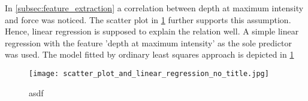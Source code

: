 

In \cref{subsec:feature_extraction} a correlation between depth at maximum intensity and force was noticed.
The scatter plot in \cref{fig:scatter_plot} further supports this assumption.
Hence, linear regression is supposed to explain the relation well.
A simple linear regression with the feature 'depth at maximum intensity' as the sole predictor was used.
The model fitted by ordinary least squares approach is depicted in \cref{fig:scatter_plot}

\begin{figure}
    \centering
    \texttt{[image: scatter\_plot\_and\_linear\_regression\_no\_title.jpg]}
    \caption{asdf}
    \label{fig:scatter_plot}
\end{figure}
